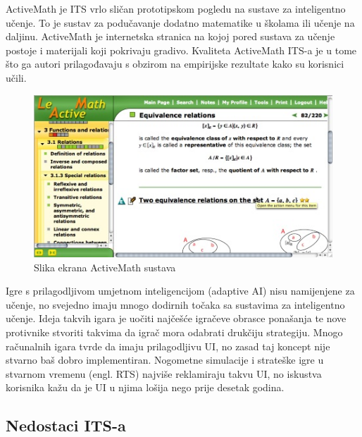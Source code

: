 \documentclass[times, utf8, zavrsni]{fer}
\begin{document}
\par
ActiveMath je ITS vrlo sličan prototipskom pogledu na sustave za inteligentno učenje. To je sustav za podučavanje dodatno matematike u školama ili učenje na daljinu. ActiveMath je internetska stranica na kojoj pored sustava za učenje postoje i materijali koji pokrivaju gradivo. Kvaliteta ActiveMath ITS-a je u tome što ga autori prilagođavaju s obzirom na empirijske rezultate kako su korisnici učili.

\begin{figure}[htb]
	\centering
	\includegraphics[]{img/activemath.jpg}
	\caption{Slika ekrana ActiveMath sustava}
	\label{fig:activemath}
\end{figure}


\par
Igre s prilagodljivom umjetnom inteligencijom (adaptive AI) nisu namijenjene za učenje, no svejedno imaju mnogo dodirnih točaka sa sustavima za inteligentno učenje. Ideja takvih igara je uočiti najčešće igračeve obrasce ponašanja te nove protivnike stvoriti takvima da igrač mora odabrati drukčiju strategiju. Mnogo računalnih igara tvrde da imaju prilagodljivu UI, no zasad taj koncept nije stvarno baš dobro implementiran. Nogometne simulacije i strateške igre u stvarnom vremenu (engl. RTS) najviše reklamiraju takvu UI, no iskustva korisnika kažu da je UI u njima lošija nego prije desetak godina.

\subsection{Nedostaci ITS-a}
\end{document}
